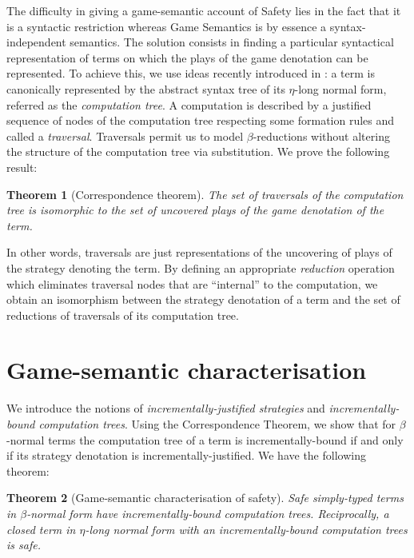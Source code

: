 \documentclass{ouclprgsc}
\newtheorem{thm}{Theorem}
\begin{document}
The difficulty in giving a game-semantic account of Safety lies in
the fact that it is a syntactic restriction whereas Game Semantics
is by essence a syntax-independent semantics. The solution consists
in finding a particular syntactical representation of terms on which
the plays of the game denotation can be represented.
 To achieve
this, we use ideas recently introduced in \cite{OngLics2006}: a term
is canonically represented by the abstract syntax tree of its
$\eta$-long normal form, referred as the \emph{computation tree}. A
computation is described by a justified sequence of nodes of the
computation tree respecting some formation rules and called a
\emph{traversal}. Traversals permit us to model $\beta$-reductions
without altering the structure of the computation tree via
substitution.
We prove the following result:
\begin{thm}[Correspondence theorem]
\label{thm:corresp} The set of traversals of the computation tree is
isomorphic to the set of uncovered plays of the game denotation of
the term.
\end{thm}

In other words, traversals are just representations of the
uncovering of plays of the strategy denoting the term. By defining
an appropriate \emph{reduction} operation which eliminates traversal
nodes that are ``internal'' to the computation, we obtain an
isomorphism between the strategy denotation of a term and the set of
reductions of traversals of its computation tree.

\section{Game-semantic characterisation}

We introduce the notions of \emph{incrementally-justified
strategies} and \emph{incrementally-bound computation trees}. Using
the Correspondence Theorem, we show that for $\beta$-normal terms
the computation tree of a term is incrementally-bound if and only if
its strategy denotation is incrementally-justified. We have the
following theorem:

\begin{thm}[Game-semantic characterisation of safety]
\label{thm:gamesem_charact} Safe simply-typed terms in
$\beta$-normal form have incrementally-bound computation trees.
Reciprocally, a closed term in $\eta$-long normal form with an
incrementally-bound computation trees is safe.
\end{thm}
\end{document}
